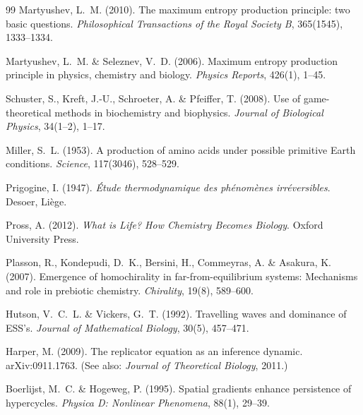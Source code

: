 \documentclass[12pt,a4paper]{article}
\theoremstyle{remark}
\begin{document}
\begin{thebibliography}{99}
Martyushev, L.~M. (2010).
\newblock The maximum entropy production principle: two basic questions.
\newblock \textit{Philosophical Transactions of the Royal Society B}, 365(1545), 1333--1334.

Martyushev, L.~M. \& Seleznev, V.~D. (2006).
\newblock Maximum entropy production principle in physics, chemistry and biology.
\newblock \textit{Physics Reports}, 426(1), 1--45.

Schuster, S., Kreft, J.-U., Schroeter, A. \& Pfeiffer, T. (2008).
\newblock Use of game-theoretical methods in biochemistry and biophysics.
\newblock \textit{Journal of Biological Physics}, 34(1--2), 1--17.

Miller, S.~L. (1953).
\newblock A production of amino acids under possible primitive Earth conditions.
\newblock \textit{Science}, 117(3046), 528--529.


Prigogine, I. (1947).
\newblock \textit{\'Etude thermodynamique des ph\'enom\`enes irr\'eversibles}.
\newblock Desoer, Li\`ege.

Pross, A. (2012).
\newblock \textit{What is Life? How Chemistry Becomes Biology}.
\newblock Oxford University Press.

Plasson, R., Kondepudi, D.~K., Bersini, H., Commeyras, A. \& Asakura, K. (2007).
\newblock Emergence of homochirality in far-from-equilibrium systems: Mechanisms and role in prebiotic chemistry.
\newblock \textit{Chirality}, 19(8), 589--600.

Hutson, V.~C.~L. \& Vickers, G.~T. (1992).
\newblock Travelling waves and dominance of ESS's.
\newblock \textit{Journal of Mathematical Biology}, 30(5), 457--471.

Harper, M. (2009).
\newblock The replicator equation as an inference dynamic.
\newblock arXiv:0911.1763.
\newblock (See also: \textit{Journal of Theoretical Biology}, 2011.)

Boerlijst, M.~C. \& Hogeweg, P. (1995).
\newblock Spatial gradients enhance persistence of hypercycles.
\newblock \textit{Physica D: Nonlinear Phenomena}, 88(1), 29--39.


\end{thebibliography}
\end{document}
